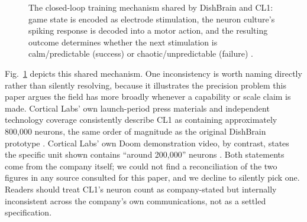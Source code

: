 \documentclass[journal]{IEEEtran}
\begin{document}
\begin{figure}[!t]
\centering
{}
\caption{The closed-loop training mechanism shared by DishBrain and CL1: game
state is encoded as electrode stimulation, the neuron culture's spiking response
is decoded into a motor action, and the resulting outcome determines whether the
next stimulation is calm/predictable (success) or chaotic/unpredictable (failure)
\cite{kagan2022dishbrain, corticallabs2026doom}.}
\label{fig:loop}
\end{figure}

Fig.~\ref{fig:loop} depicts this shared mechanism. One inconsistency is worth naming
directly rather than silently resolving, because it illustrates the precision problem
this paper argues the field has more broadly whenever a capability or scale claim is
made. Cortical Labs' own launch-period press materials and independent technology
coverage consistently describe CL1 as containing approximately 800{,}000 neurons, the
same order of magnitude as the original DishBrain prototype \cite{corticallabs2025cl1}.
Cortical Labs' own Doom demonstration video, by contrast, states the specific unit
shown contains ``around 200{,}000'' neurons \cite{corticallabs2026doom}. Both
statements come from the company itself; we could not find a reconciliation of the
two figures in any source consulted for this paper, and we decline to silently pick
one. Readers should treat CL1's neuron count as company-stated but internally
inconsistent across the company's own communications, not as a settled specification.
\end{document}

